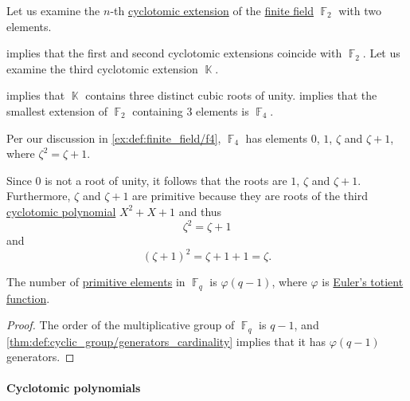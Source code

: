 \begin{example}
\begin{thmenum}
     Let us examine the \( n \)-th \hyperref[def:cyclotomic_extension]{cyclotomic extension} of the \hyperref[def:finite_field]{finite field} \( \BbbF_2 \) with two elements.

     implies that the first and second cyclotomic extensions coincide with \( \BbbF_2 \). Let us examine the third cyclotomic extension \( \BbbK \).

     implies that \( \BbbK \) contains three distinct cubic roots of unity.  implies that the smallest extension of \( \BbbF_2 \) containing \( 3 \) elements is \( \BbbF_4 \).

    Per our discussion in \cref{ex:def:finite_field/f4}, \( \BbbF_4 \) has elements \( 0 \), \( 1 \), \( \zeta \) and \( \zeta + 1 \), where \( \zeta^2 = \zeta + 1 \).

    Since \( 0 \) is not a root of unity, it follows that the roots are \( 1 \), \( \zeta \) and \( \zeta + 1 \). Furthermore, \( \zeta \) and \( \zeta + 1 \) are primitive because they are roots of the third \hyperref[def:cyclotomic_polynomial]{cyclotomic polynomial} \( X^2 + X + 1 \) and thus
    \begin{equation*}
      \zeta^2 = \zeta + 1
    \end{equation*}
    and
    \begin{equation*}
      (\zeta + 1)^2 = \zeta + 1 + 1 = \zeta.
    \end{equation*}
  \end{thmenum}
\end{example}

\begin{proposition}\label{thm:primitive_element_cardinality}
  The number of \hyperref[def:finite_field_primitive_element]{primitive elements} in \( \BbbF_q \) is \( \varphi(q - 1) \), where \( \varphi \) is \hyperref[def:eulers_totient_function]{Euler's totient function}.
\end{proposition}
\begin{proof}
  The order of the multiplicative group of \( \BbbF_q \) is \( q - 1 \), and \cref{thm:def:cyclic_group/generators_cardinality} implies that it has \( \varphi(q - 1) \) generators.
\end{proof}

\paragraph{Cyclotomic polynomials}

